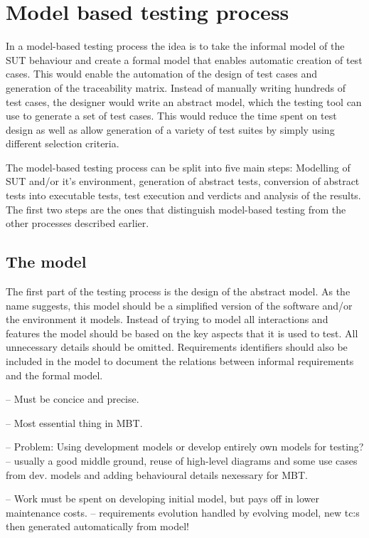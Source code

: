 \section{Model based testing process}
In a model-based testing process the idea is to take the informal model of the SUT behaviour and create a formal model that enables automatic creation of test cases. This would enable the automation of the design of test cases and generation of the traceability matrix. Instead of manually writing hundreds of test cases, the designer would write an abstract model, which the testing tool can use to generate a set of test cases. This would reduce the time spent on test design as well as allow generation of a variety of test suites by simply using different selection criteria.

The model-based testing process can be split into five main steps: Modelling of SUT and/or it's environment, generation of abstract tests, conversion of abstract tests into executable tests, test execution and verdicts and analysis of the results. The first two steps are the ones that distinguish model-based testing from the other processes described earlier.


\subsection{The model}
The first part of the testing process is the design of the abstract model. As the name suggests, this model should be a simplified version of the software and/or the environment it models. Instead of trying to model all interactions and features the model should be based on the key aspects that it is used to test. All unnecessary details should be omitted. Requirements identifiers should also be included in the model to document the relations between informal requirements and the formal model.

-- Must be concice and precise. 

-- Most essential thing in MBT.

-- Problem: Using development models or develop entirely own models for testing? 
	-- usually a good middle ground, reuse of high-level diagrams and some use cases from dev. models and adding behavioural details nexessary for MBT.

-- Work must be spent on developing initial model, but pays off in lower maintenance costs.
	-- requirements evolution handled by evolving model, new tc:s then generated automatically from model! 
	
